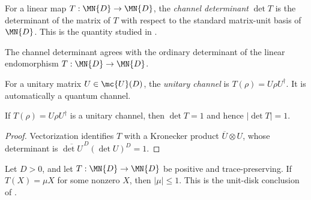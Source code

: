 
\begin{definition}\label{def:channel_det}
    \leanok
    For a linear map $T : \MN{D} \to \MN{D}$, the
    \emph{channel determinant} $\det T$ is the determinant of the
    matrix of $T$ with respect to the standard matrix-unit basis
    of $\MN{D}$.
    This is the quantity studied in \cite[Section~6.1]{Wolf2012Quantum}.
\end{definition}

\begin{remark}
    \label{rem:channel_det_linearMap_det}
    \leanok
    The channel determinant agrees with the ordinary determinant of the linear
    endomorphism $T : \MN{D} \to \MN{D}$.
\end{remark}

\begin{definition}\label{def:unitary_channel}
    \leanok
    For a unitary matrix $U \in \mc{U}(D)$, the
    \emph{unitary channel} is $T(\rho)=U\rho U^\dagger$.
    It is automatically a quantum channel.
\end{definition}

\begin{theorem}
    \label{thm:channel_det_unitary_eq_one}
    \leanok
    If $T(\rho)=U\rho U^\dagger$ is a unitary channel, then
    $\det T=1$ and hence $|\det T|=1$.
\end{theorem}

\begin{proof}\leanok
    Vectorization identifies $T$ with a Kronecker product
    $\overline{U}\otimes U$, whose determinant is
    $\overline{\det U}^{\,D}(\det U)^D=1$.
\end{proof}

\begin{theorem}
    \label{thm:positive_tp_eigenvalue_disk}
    \leanok
    Let $D>0$, and let $T:\MN{D}\to\MN{D}$ be positive and trace-preserving.
    If $T(X)=\mu X$ for some nonzero $X$, then $|\mu|\leq1$.
    This is the unit-disk conclusion of
    \cite[Proposition~6.1]{Wolf2012Quantum}.
\end{theorem}

